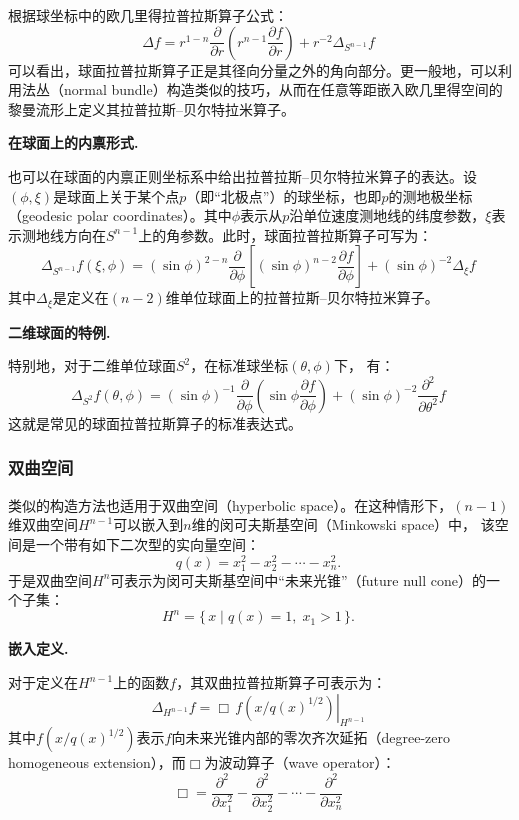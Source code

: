 根据球坐标中的欧几里得拉普拉斯算子公式：
\[
\Delta f
= r^{1-n} \frac{\partial}{\partial r}
\left( r^{n-1} \frac{\partial f}{\partial r} \right)
+ r^{-2} \Delta_{S^{n-1}} f~
\]
可以看出，球面拉普拉斯算子正是其径向分量之外的角向部分。更一般地，可以利用法丛（normal bundle）构造类似的技巧，从而在任意等距嵌入欧几里得空间的黎曼流形上定义其拉普拉斯–贝尔特拉米算子。

\textbf{在球面上的内禀形式.}

也可以在球面的内禀正则坐标系中给出拉普拉斯–贝尔特拉米算子的表达。设$(\phi, \xi)$是球面上关于某个点$p$（即“北极点”）的球坐标，也即$p$的测地极坐标（geodesic polar coordinates）。其中$\phi$表示从$p$沿单位速度测地线的纬度参数，$\xi$表示测地线方向在$S^{n-1}$上的角参数。此时，球面拉普拉斯算子可写为：
\[
\Delta_{S^{n-1}} f(\xi, \phi)
= (\sin \phi)^{2-n}
\frac{\partial}{\partial \phi}
\left[ (\sin \phi)^{n-2} \frac{\partial f}{\partial \phi} \right]
+ (\sin \phi)^{-2} \Delta_{\xi} f~
\]
其中$\Delta_{\xi}$是定义在$(n-2)$维单位球面上的拉普拉斯–贝尔特拉米算子。

\textbf{二维球面的特例.}

特别地，对于二维单位球面$S^{2}$，在标准球坐标$(\theta, \phi)$下，
有：
\[
\Delta_{S^{2}} f(\theta, \phi)
= (\sin \phi)^{-1}
\frac{\partial}{\partial \phi}
\left( \sin \phi \frac{\partial f}{\partial \phi} \right)
+ (\sin \phi)^{-2}
\frac{\partial^{2}}{\partial \theta^{2}}f~
\]
这就是常见的球面拉普拉斯算子的标准表达式。
\subsubsection{双曲空间}
类似的构造方法也适用于双曲空间（hyperbolic space）。在这种情形下，$(n-1)$ 维双曲空间$H^{n-1}$可以嵌入到$n$维的闵可夫斯基空间（Minkowski space）中，
该空间是一个带有如下二次型的实向量空间：
\[
q(x) = x_{1}^{2} - x_{2}^{2} - \cdots - x_{n}^{2}.~
\]
于是双曲空间$H^{n}$可表示为闵可夫斯基空间中“未来光锥”（future null cone）的一个子集：
\[
H^{n} = \{\, x \mid q(x) = 1,\; x_{1} > 1 \,\}.~
\]

\textbf{嵌入定义.}

对于定义在$H^{n-1}$上的函数$f$，其双曲拉普拉斯算子可表示为：
\[
\Delta_{H^{n-1}} f
= \left. \Box\, f\!\left( x/q(x)^{1/2} \right) \right|_{H^{n-1}}~
\]
其中$f\!\left( x / q(x)^{1/2} \right)$表示$f$向未来光锥内部的零次齐次延拓（degree-zero homogeneous extension），而$\Box$为波动算子（wave operator）：
\[
\Box
= \frac{\partial^{2}}{\partial x_{1}^{2}}
 - \frac{\partial^{2}}{\partial x_{2}^{2}}
 - \cdots
 - \frac{\partial^{2}}{\partial x_{n}^{2}}~
\]

